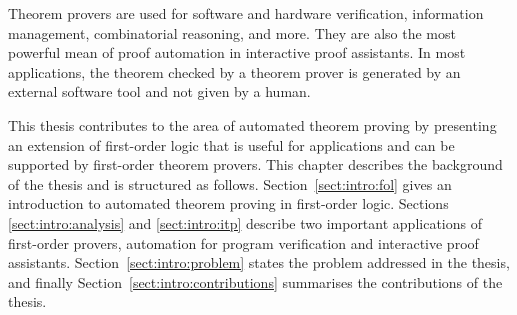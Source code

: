 {Theorem provers are used for software and hardware verification, information management, combinatorial reasoning, and more. They are also the most powerful mean of proof automation in interactive proof assistants. In most applications, the theorem checked by a theorem prover is generated by an external software tool and not given by a human. %

This thesis contributes to the area of automated theorem proving by presenting an extension of first-order logic that is useful for applications and can be supported by first-order theorem provers. This chapter describes the background of the thesis and is structured as follows. Section~\ref{sect:intro:fol} gives an introduction to automated theorem proving in first-order logic. Sections \ref{sect:intro:analysis} and \ref{sect:intro:itp} describe two important applications of first-order provers, automation for program verification and interactive proof assistants. Section~\ref{sect:intro:problem} states the problem addressed in the thesis, and finally Section~\ref{sect:intro:contributions} summarises the contributions of the thesis.
}


